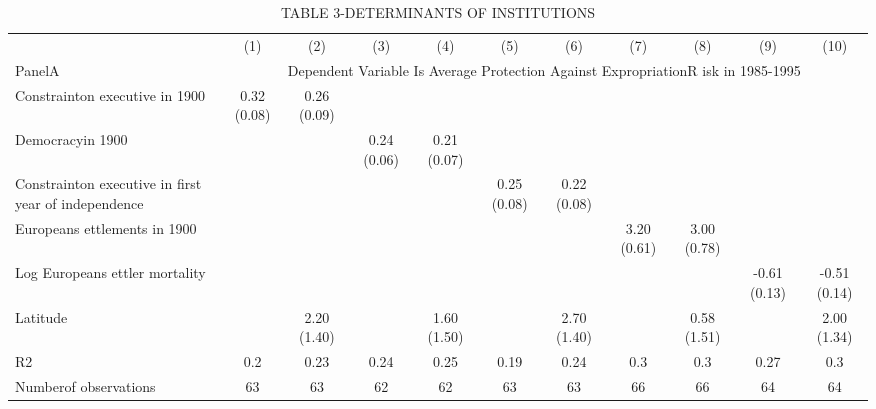 \begin{table}[htbp]
\centering
\caption{TABLE  3-DETERMINANTS OF INSTITUTIONS}
\begin{tabular}{lcccccccccc}
\hline
 & (1) & (2) & (3) & (4) & (5) & (6) & (7) & (8) & (9) & (10) \\
PanelA & \multicolumn{10}{c}{Dependent Variable Is Average Protection Against ExpropriationR isk in 1985-1995} \\
Constrainton executive in 1900 & 0.32 (0.08) & 0.26 (0.09) &  &  &  &  &  &  &  &  \\
Democracyin 1900 &  &  & 0.24 (0.06) & 0.21 (0.07) &  &  &  &  &  &  \\
Constrainton executive in first year of independence &  &  &  &  & 0.25 (0.08) & 0.22 (0.08) &  &  &  &  \\
Europeans ettlements in 1900 &  &  &  &  &  &  & 3.20 (0.61) & 3.00 (0.78) &  &  \\
Log Europeans ettler mortality &  &  &  &  &  &  &  &  & -0.61 (0.13) & -0.51 (0.14) \\
Latitude &  & 2.20 (1.40) &  & 1.60 (1.50) &  & 2.70 (1.40) &  & 0.58 (1.51) &  & 2.00 (1.34) \\
R2 & 0.2 & 0.23 & 0.24 & 0.25 & 0.19 & 0.24 & 0.3 & 0.3 & 0.27 & 0.3 \\
Numberof observations & 63 & 63 & 62 & 62 & 63 & 63 & 66 & 66 & 64 & 64 \\
\hline
\end{tabular}
\end{table}
